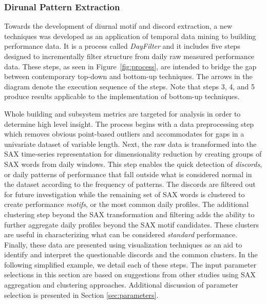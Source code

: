 \subsubsection{Dirunal Pattern Extraction}
\label{sec:dayfilter}

Towards the development of diurnal motif and discord extraction, a new techniques was developed as an application of temporal data mining to building performance data. It is a process called \emph{DayFilter} and it includes five steps designed to incrementally filter structure from daily raw measured performance data. These steps, as seen in Figure~\ref{fig:process}, are intended to bridge the gap between contemporary top-down and bottom-up techniques. The arrows in the diagram denote the execution sequence of the steps. Note that steps 3, 4, and 5 produce results applicable to the implementation of bottom-up techniques.  

Whole building and subsystem metrics are targeted for analysis in order to determine high level insight. The process begins with a data preprocessing step which removes obvious point-based outliers and accommodates for gaps in a univariate dataset of variable length. Next, the raw data is transformed into the SAX time-series representation for dimensionality reduction by creating groups of SAX words from daily windows. This step enables the quick detection of \emph{discords}, or daily patterns of performance that fall outside what is considered normal in the dataset according to the frequency of patterns. The discords are filtered out for future investigation while the remaining set of SAX words is clustered to create performance \emph{motifs}, or the most common daily profiles. The additional clustering step beyond the SAX transformation and filtering adds the ability to further aggregate daily profiles beyond the SAX motif candidates. These clusters are useful in characterizing what can be considered \emph{standard} performance. Finally, these data are presented using visualization techniques as an aid to identify and interpret the questionable discords and the common clusters. In the following simplified example, we detail each of these steps. The input parameter selections in this section are based on suggestions from other studies using SAX aggregation and clustering approaches. Additional discussion of parameter selection is presented in Section \ref{sec:parameters}.